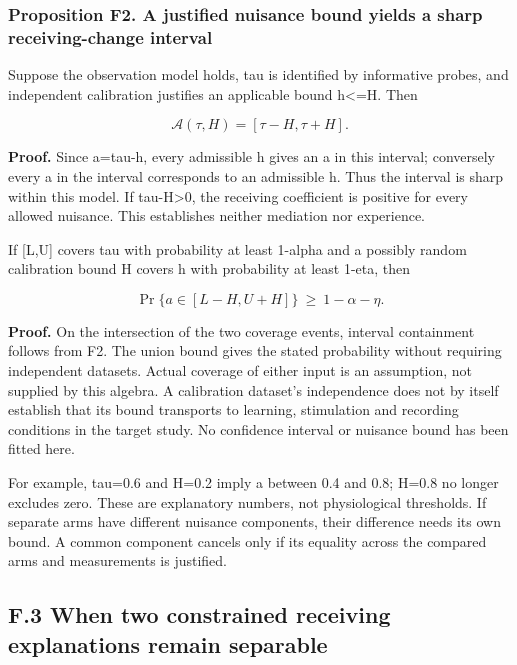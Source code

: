 \documentclass[
  american,
  11pt,
  letterpaper,
]{article}
\begin{document}
\subsubsection{Proposition F2. A justified nuisance bound yields a sharp receiving-change interval}\label{proposition-f2.-a-justified-nuisance-bound-yields-a-sharp-receiving-change-interval}

Suppose the observation model holds, tau is identified by informative probes, and independent calibration justifies an applicable bound \textbar h\textbar\textless=H. Then

\[
\mathcal A(\tau,H)=[\tau-H,\tau+H].\tag{F2}
\]

\textbf{Proof.} Since a=tau-h, every admissible h gives an a in this interval; conversely every a in the interval corresponds to an admissible h. Thus the interval is sharp within this model. If tau-H\textgreater0, the receiving coefficient is positive for every allowed nuisance. This establishes neither mediation nor experience.

If {[}L,U{]} covers tau with probability at least 1-alpha and a possibly random calibration bound H covers \textbar h\textbar{} with probability at least 1-eta, then

\[
\Pr\{a\in[L-H,U+H]\}\ \geq\ 1-\alpha-\eta.\tag{F3}
\]

\textbf{Proof.} On the intersection of the two coverage events, interval containment follows from F2. The union bound gives the stated probability without requiring independent datasets. Actual coverage of either input is an assumption, not supplied by this algebra. A calibration dataset's independence does not by itself establish that its bound transports to learning, stimulation and recording conditions in the target study. No confidence interval or nuisance bound has been fitted here.

For example, tau=0.6 and H=0.2 imply a between 0.4 and 0.8; H=0.8 no longer excludes zero. These are explanatory numbers, not physiological thresholds. If separate arms have different nuisance components, their difference needs its own bound. A common component cancels only if its equality across the compared arms and measurements is justified.

\subsection{F.3 When two constrained receiving explanations remain separable}\label{f.3-when-two-constrained-receiving-explanations-remain-separable}
\end{document}
